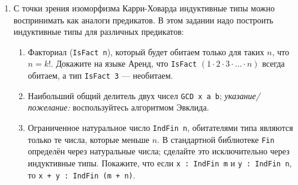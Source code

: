 \documentclass[10pt,a4paper,oneside]{article}
\begin{document}
\begin{enumerate}
\item С точки зрения изоморфизма Карри-Ховарда индуктивные типы можно воспринимать как аналоги предикатов.
В этом задании надо построить индуктивные типы для различных предикатов:
\begin{enumerate}
\item Факториал (\verb!IsFact n!), который будет обитаем только для таких $n$, что $n = k!$.
Докажите на языке Аренд, что \verb!IsFact! $(1 \cdot 2 \cdot 3 \cdot \dots \cdot n)$ всегда обитаем, а
тип \verb!IsFact 3! --- необитаем.
\item Наибольший общий делитель двух чисел \verb!GCD x a b!; \emph{указание/пожелание:} воспользуйтесь алгоритмом Эвклида.  
\item Ограниченное натуральное число \verb!IndFin n!, обитателями типа являются только те числа, которые меньше $n$.
В стандартной библиотеке \verb!Fin! определён через натуральные числа; 
сделайте это исключительно через индуктивные типы. Покажите, что если \verb!x : IndFin m! и \verb!y : IndFin n!,
то \verb!x + y : IndFin (m + n)!.
\end{enumerate}
\end{enumerate}
\end{document}
